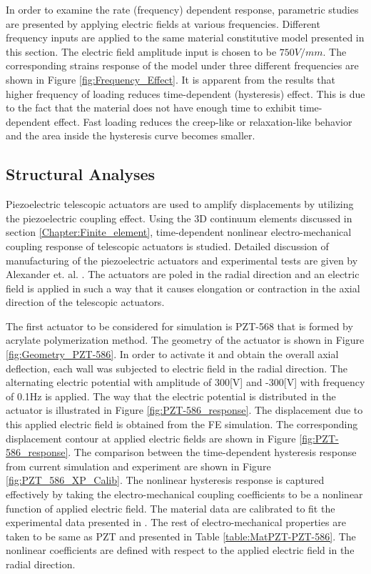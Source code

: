  
In order to examine the rate (frequency) dependent response, parametric studies are presented by applying electric fields at various frequencies. 
Different frequency inputs are applied to the same material constitutive model presented in this section. The electric field amplitude input is chosen to be $750 V/mm$.
The corresponding strains response of the model under three different frequencies are shown in Figure \ref{fig:Frequency_Effect}. 
It is apparent from the results that higher frequency of loading reduces time-dependent (hysteresis) effect. 
This is due to the fact that the material does not have enough time to exhibit time-dependent effect. 
Fast loading reduces the creep-like or relaxation-like behavior and the area inside the hysteresis curve becomes smaller.  



\subsection{Structural Analyses}

Piezoelectric telescopic actuators are used to amplify displacements by utilizing the piezoelectric coupling effect. 
Using the 3D continuum elements discussed in section \ref{Chapter:Finite_element}, 
time-dependent nonlinear electro-mechanical coupling response of telescopic actuators is studied. Detailed discussion of manufacturing of the piezoelectric actuators and experimental tests are given by Alexander et. al. \cite{Alexander,Alexander2003,Alexander2001}. 
The actuators are poled in the radial direction and an electric field is applied in such a way that it causes elongation or contraction in the axial direction of the telescopic actuators. 

The first actuator to be considered for simulation is PZT-568 that is formed by acrylate polymerization method. 
The geometry of the actuator is shown in Figure \ref{fig:Geometry_PZT-586}. 
In order to activate it and obtain the overall axial deflection, each wall was
subjected to electric field in the radial direction.
The alternating electric potential with amplitude of 300[V] and -300[V] with frequency of 0.1Hz is applied. 
The way that the electric potential is distributed in the actuator is illustrated in Figure \ref{fig:PZT-586_response}. 
The displacement due to this applied electric field is obtained from the FE simulation. 
The corresponding displacement contour at applied electric fields are shown in Figure \ref{fig:PZT-586_response}. 
The comparison between the time-dependent hysteresis response from current simulation and experiment are shown in Figure \ref{fig:PZT_586_XP_Calib}. 
The nonlinear hysteresis response is captured effectively by taking the electro-mechanical coupling coefficients to be a nonlinear function of applied electric field. 
The material data are calibrated to fit the experimental data presented in \cite{Alexander,Alexander2003}. 
The rest of electro-mechanical properties are taken to be same as PZT and presented in Table \ref{table:MatPZT-PZT-586}. 
The nonlinear coefficients are defined with respect to the applied electric field in the radial direction.

